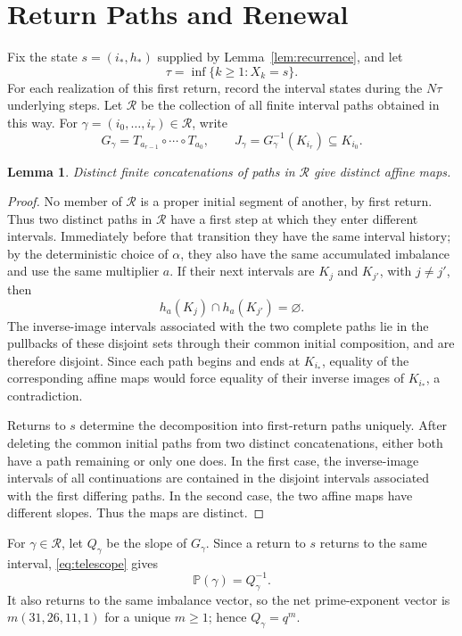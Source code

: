 \documentclass[11pt]{article}
\newtheorem{lemma}[theorem]{Lemma}
\newcommand{\lemref}[1]{Lemma~\ref{#1}}
\begin{document}
\section{Return Paths and Renewal}

Fix the state $s=(i_\ast,h_\ast)$ supplied by \lemref{lem:recurrence}, and let
\[
\tau=\inf\{k\geq1:X_k=s\}.
\]
For each realization of this first return, record the interval states during the $N\tau$ underlying steps. Let $\mathcal R$ be the collection of all finite interval paths obtained in this way. For $\gamma=(i_0,\ldots,i_r)\in\mathcal R$, write
\[
G_\gamma=T_{a_{r-1}}\circ\cdots\circ T_{a_0},
\qquad
J_\gamma=G_\gamma^{-1}(K_{i_r})\subseteq K_{i_0}.
\]

\begin{lemma}\label{lem:injective}
Distinct finite concatenations of paths in $\mathcal R$ give distinct affine maps.
\end{lemma}

\begin{proof}
No member of $\mathcal R$ is a proper initial segment of another, by first return. Thus two distinct paths in $\mathcal R$ have a first step at which they enter different intervals. Immediately before that transition they have the same interval history; by the deterministic choice of $\alpha$, they also have the same accumulated imbalance and use the same multiplier $a$. If their next intervals are $K_j$ and $K_{j'}$, with $j\neq j'$, then
\[
h_a(K_j)\cap h_a(K_{j'})=\varnothing.
\]
The inverse-image intervals associated with the two complete paths lie in the pullbacks of these disjoint sets through their common initial composition, and are therefore disjoint. Since each path begins and ends at $K_{i_\ast}$, equality of the corresponding affine maps would force equality of their inverse images of $K_{i_\ast}$, a contradiction.

Returns to $s$ determine the decomposition into first-return paths uniquely. After deleting the common initial paths from two distinct concatenations, either both have a path remaining or only one does. In the first case, the inverse-image intervals of all continuations are contained in the disjoint intervals associated with the first differing paths. In the second case, the two affine maps have different slopes. Thus the maps are distinct.
\end{proof}

For $\gamma\in\mathcal R$, let $Q_\gamma$ be the slope of $G_\gamma$. Since a return to $s$ returns to the same interval, \eqref{eq:telescope} gives
\[
\mathbb P(\gamma)=Q_\gamma^{-1}.
\]
It also returns to the same imbalance vector, so the net prime-exponent vector is $m(31,26,11,1)$ for a unique $m\geq1$; hence $Q_\gamma=q^m$.
\end{document}
